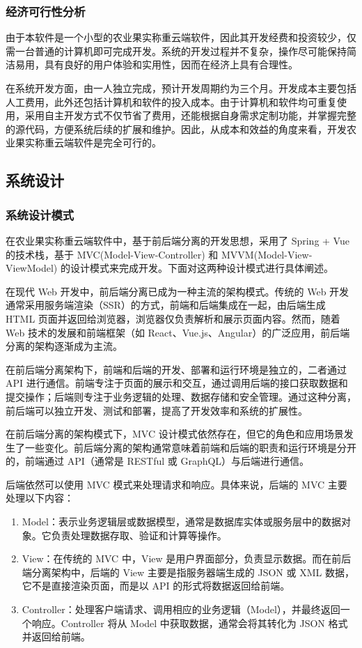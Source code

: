 \documentclass{xduugmr}
\begin{document}
\subsubsection{经济可行性分析}

由于本软件是一个小型的农业果实称重云端软件，因此其开发经费和投资较少，仅需一台普通的计算机即可完成开发。系统的开发过程并不复杂，操作尽可能保持简洁易用，具有良好的用户体验和实用性，因而在经济上具有合理性。

在系统开发方面，由一人独立完成，预计开发周期约为三个月。开发成本主要包括人工费用，此外还包括计算机和软件的投入成本。由于计算机和软件均可重复使用，采用自主开发方式不仅节省了费用，还能根据自身需求定制功能，并掌握完整的源代码，方便系统后续的扩展和维护。因此，从成本和效益的角度来看，开发农业果实称重云端软件是完全可行的。

\subsection{系统设计}

\subsubsection{系统设计模式}

在农业果实称重云端软件中，基于前后端分离的开发思想，采用了 Spring + Vue 的技术栈，基于 MVC(Model-View-Controller) 和 MVVM(Model-View-ViewModel) 的设计模式来完成开发。下面对这两种设计模式进行具体阐述。

在现代 Web 开发中，前后端分离已成为一种主流的架构模式。传统的 Web 开发通常采用服务端渲染（SSR）的方式，前端和后端集成在一起，由后端生成 HTML 页面并返回给浏览器，浏览器仅负责解析和展示页面内容。然而，随着 Web 技术的发展和前端框架（如 React、Vue.js、Angular）的广泛应用，前后端分离的架构逐渐成为主流。

在前后端分离架构下，前端和后端的开发、部署和运行环境是独立的，二者通过 API 进行通信。前端专注于页面的展示和交互，通过调用后端的接口获取数据和提交操作；后端则专注于业务逻辑的处理、数据存储和安全管理。通过这种分离，前后端可以独立开发、测试和部署，提高了开发效率和系统的扩展性。

在前后端分离的架构模式下，MVC 设计模式依然存在，但它的角色和应用场景发生了一些变化。前后端分离的架构通常意味着前端和后端的职责和运行环境是分开的，前端通过 API（通常是 RESTful 或 GraphQL）与后端进行通信。

后端依然可以使用 MVC 模式来处理请求和响应。具体来说，后端的 MVC 主要处理以下内容：
\begin{enumerate}
    \item Model：表示业务逻辑层或数据模型，通常是数据库实体或服务层中的数据对象。它负责处理数据存取、验证和计算等操作。
    \item View：在传统的 MVC 中，View 是用户界面部分，负责显示数据。而在前后端分离架构中，后端的 View 主要是指服务器端生成的 JSON 或 XML 数据，它不是直接渲染页面，而是以 API 的形式将数据返回给前端。
    \item Controller：处理客户端请求、调用相应的业务逻辑（Model），并最终返回一个响应。Controller 将从 Model 中获取数据，通常会将其转化为 JSON 格式并返回给前端。
\end{enumerate}
\end{document}
